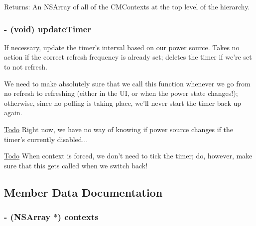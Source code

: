 \begin{Desc}
\item[Returns:]An NSArray of all of the CMContexts at the top level of the hierarchy. \end{Desc}
\hypertarget{interface_c_m_context_controller_6ad2cdc6ec1494e5f89a24cf5472600f}{
\subsubsection[updateTimer]{\setlength{\rightskip}{0pt plus 5cm}- (void) updateTimer }}
\label{interface_c_m_context_controller_6ad2cdc6ec1494e5f89a24cf5472600f}


If necessary, update the timer's interval based on our power source. Takes no action if the correct refresh frequency is already set; deletes the timer if we're set to not refresh.

We need to make absolutely sure that we call this function whenever we go from no refresh to refreshing (either in the UI, or when the power state changes!); otherwise, since no polling is taking place, we'll never start the timer back up again.

\begin{Desc}
\item[\hyperlink{todo__todo000002}{Todo}]Right now, we have no way of knowing if power source changes if the timer's currently disabled... \end{Desc}
\begin{Desc}
\item[\hyperlink{todo__todo000002}{Todo}]When context is forced, we don't need to tick the timer; do, however, make sure that this gets called when we switch back! \end{Desc}


\subsection{Member Data Documentation}
\hypertarget{interface_c_m_context_controller_2563c65be09f418bb5ae7a6ce6389afe}{
\subsubsection[contexts]{\setlength{\rightskip}{0pt plus 5cm}- (NSArray $\ast$) {\bf contexts}}}
\label{interface_c_m_context_controller_2563c65be09f418bb5ae7a6ce6389afe}


